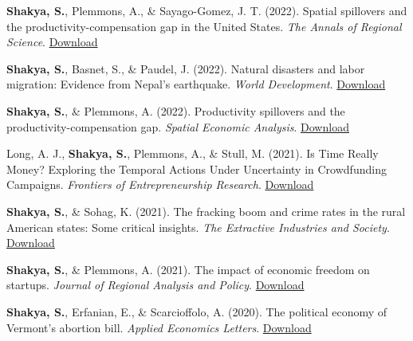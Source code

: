 \begin{etaremune}
\item \textbf{Shakya, S.}, Plemmons, A., \& Sayago-Gomez, J. T. (2022). Spatial spillovers and the productivity-compensation gap in the United States. \textit{The Annals of Regional Science}. \hfill \href{https://www.dropbox.com/scl/fi/tf99i7zifoqrx9zyyybpj/Spatial-Spillovers-and-the-Productivity-Compensation.pdf?rlkey=kklhwmtat547j88dp7ghz4xwx&dl=0}{Download}

\item \textbf{Shakya, S.}, Basnet, S., \& Paudel, J. (2022). Natural disasters and labor migration: Evidence from Nepal's earthquake. \textit{World Development}. \hfill \href{https://www.dropbox.com/scl/fi/883lv35mzgnhdfnlmyeqt/Natural-disasters-and-labor-migration-Evidence-from-Nepal-s-earthquake.pdf?rlkey=8in4xafkl8su5e950dpn0uqrn&dl=0}{Download}

\item \textbf{Shakya, S.}, \& Plemmons, A. (2022). Productivity spillovers and the productivity-compensation gap. \textit{Spatial Economic Analysis}. \hfill \href{https://www.dropbox.com/scl/fi/0hspku758et24sw781ara/Shakya-Plemmons-SEA-2022.pdf?rlkey=y5ndrb1jilznbzzwfyxkmkdwa&dl=0}{Download}

\item Long, A. J., \textbf{Shakya, S.}, Plemmons, A., \& Stull, M. (2021). Is Time Really Money? Exploring the Temporal Actions Under Uncertainty in Crowdfunding Campaigns. \textit{Frontiers of Entrepreneurship Research}. \hfill \href{https://www.dropbox.com/scl/fi/0wr1vqkb980vtydusrp4t/ferpapers_4349.pdf?rlkey=il3xqgsy2502c1ywdifaj3ag6&st=ljdqj8xs&dl=0}{Download}

\item \textbf{Shakya, S.}, \& Sohag, K. (2021). The fracking boom and crime rates in the rural American states: Some critical insights. \textit{The Extractive Industries and Society}. \hfill \href{https://www.dropbox.com/scl/fi/sa9pq8amlw5hzhizqrt44/The-fracking-boom-and-crime-rates-in-rural-American-states-Some-critical-insights.pdf?rlkey=lo4r0ed4d3bo2gte4gctizy7d&dl=0}{Download}

\item \textbf{Shakya, S.}, \& Plemmons, A. (2021). The impact of economic freedom on startups. \textit{Journal of Regional Analysis and Policy}. \hfill \href{https://jrap.scholasticahq.com/article/18968-the-impact-of-economic-freedom-on-startups/attachment/50505.pdf}{Download}

\item \textbf{Shakya, S.}, Erfanian, E., \& Scarcioffolo, A. (2020). The political economy of Vermont's abortion bill. \textit{Applied Economics Letters}. \hfill \href{https://www.tandfonline.com/doi/abs/10.1080/13504851.2020.1854663}{Download}


\end{etaremune}
